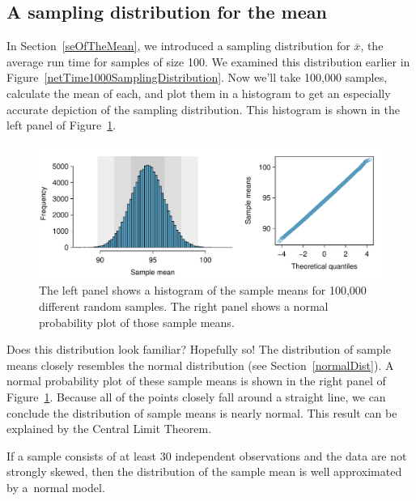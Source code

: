 \subsection{A sampling distribution for the mean}

In Section~\ref{seOfTheMean}, we introduced a sampling distribution for $\bar{x}$, the average run time for samples of size 100. We examined this distribution earlier in Figure~\ref{netTime1000SamplingDistribution}. Now we'll take 100,000 samples, calculate the mean of each, and plot them in a histogram to get an especially accurate depiction of the sampling distribution. This histogram is shown in the left panel of Figure~\ref{netTimeBigSamplingDistribution}.

\begin{figure}[hht]
   \centering
   \includegraphics[width=\textwidth]{04/figures/netTimeBigSamplingDistribution/netTimeBigSamplingDistribution}
   \caption{The left panel shows a histogram of the sample means for 100,000 different random samples. The right panel shows a normal probability plot of those sample means.}
   \label{netTimeBigSamplingDistribution}
\end{figure}

Does this distribution look familiar? Hopefully so! The distribution of sample means closely resembles the normal distribution (see Section~\ref{normalDist}). A normal probability plot of these sample means is shown in the right panel of Figure~\ref{netTimeBigSamplingDistribution}. Because all of the points closely fall around a straight line, we can conclude the distribution of sample means is nearly normal. This result can be explained by the Central Limit Theorem.

\begin{termBox}{
If a sample consists of at least 30 independent observations and the data are not strongly skewed, then the distribution of the sample mean is well approximated by a~normal model.}
\end{termBox}

